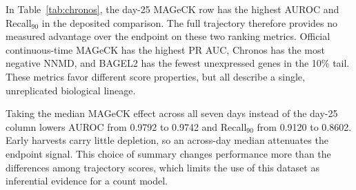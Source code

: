 In Table~\ref{tab:chronos}, the day-25 MAGeCK row has the highest AUROC and
Recall$_{90}$ in the deposited comparison.  The full trajectory therefore
provides no measured advantage over the endpoint on these two ranking metrics.
Official continuous-time MAGeCK has the highest PR AUC, Chronos has the most
negative NNMD, and BAGEL2 has the fewest unexpressed genes in the 10\% tail.
These metrics favor different score properties, but all describe a single,
unreplicated biological lineage.

Taking the median MAGeCK effect across all seven days instead of the day-25
column lowers AUROC from 0.9792 to 0.9742 and Recall$_{90}$ from 0.9120 to
0.8602.  Early harvests carry little depletion, so an across-day median
attenuates the endpoint signal. This choice of summary changes performance
more than the differences among trajectory scores, which limits the use of
this dataset as inferential evidence for a count model.
